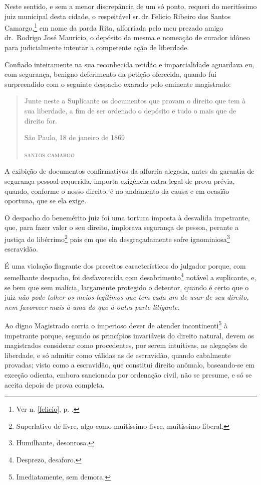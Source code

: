 Neste sentido, e sem a menor discrepância de um só ponto, requeri do
meritíssimo juiz municipal desta cidade, o respeitável sr.\,dr.\,Felicio
Ribeiro dos Santos Camargo,\footnote{Ver n. \ref{felicio}, p. \pageref{felicio}.} 
em nome da parda Rita, alforriada pelo meu prezado amigo dr.~Rodrigo 
José Maurício, o depósito da mesma e nomeação de curador idôneo
para judicialmente intentar a competente ação de liberdade.

Confiado inteiramente na sua reconhecida retidão e imparcialidade
aguardava eu, com segurança, benigno deferimento da petição oferecida,
quando fui surpreendido com o seguinte despacho exarado pelo eminente
magistrado:

\begin{quote}
Junte neste a Suplicante os documentos que provam o direito que
tem à sua liberdade, a fim de ser ordenado o depósito e tudo o mais que
de direito for.

\begin{flushright}
São Paulo, 18 de janeiro de 1869

\textsc{santos camargo}
\end{flushright}
\end{quote}

A exibição de documentos confirmativos da alforria alegada, antes da
garantia de segurança pessoal requerida, importa exigência extra-legal
de prova prévia, quando, conforme o nosso direito, é no andamento da
causa e em ocasião oportuna, que se ela exige.

O despacho do benemérito juiz foi uma tortura imposta à desvalida
impetrante, que, para fazer valer o seu direito, implorava segurança de
pessoa, perante a justiça do libérrimo\footnote{Superlativo de livre,
  algo como muitíssimo livre, muitíssimo liberal.} país em que ela
desgraçadamente sofre ignominiosa\footnote{Humilhante, desonrosa.}
escravidão.

É uma violação flagrante dos preceitos característicos do julgador
porque, com semelhante despacho, foi desfavorecida com
desabrimento\footnote{Desprezo, desaforo.} notável a suplicante, e, se
bem que sem malícia, largamente protegido o detentor, quando é certo que
o juiz \emph{não pode tolher os meios legítimos que tem cada um de usar
de seu direito, nem favorecer mais à uma do que à outra parte
litigante}.

Ao digno Magistrado corria o imperioso dever de atender
incontinenti\footnote{Imediatamente, sem demora.} à impetrante porque,
segundo os princípios invariáveis do direito natural, devem os
magistrados considerar como procedentes, por serem intuitivas, as
alegações de liberdade, e só admitir como válidas as de escravidão,
quando cabalmente provadas; visto como a escravidão, que constitui
direito anômalo, baseando-se em exceção odienta, embora sancionada por
ordenação civil, não se presume, e só se aceita depois de prova
completa.

